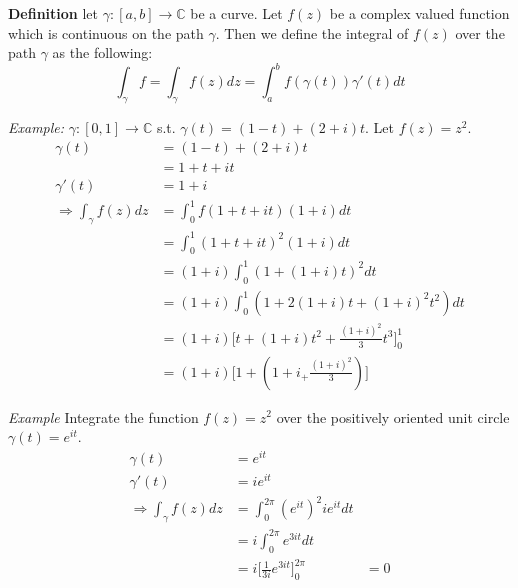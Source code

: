 \documentclass[a4paper, 11pt]{article}
\begin{document}
\noindent \textbf{Definition} let $\gamma:[a,b]\rightarrow\mathbb{C}$ be a curve. Let $f(z)$ be a complex valued function which is continuous on the path $\gamma$. Then we define the integral of $f(z)$ over the path $\gamma$ as the following: 
	\begin{equation*}
	\int_\gamma f = \int_\gamma f(z)dz = \int_a^b f(\gamma(t))\gamma'(t)dt
	\end{equation*}
		
\noindent\textit{Example:} $\gamma:[0,1]\rightarrow\mathbb{C}$ s.t. $\gamma(t) = (1-t)+(2+i)t$. Let $f(z)=z^2$. 
	\begin{align*}
		\gamma(t) &= (1-t) +(2+i)t \\ 	
			&= 1+ t + it \\ 
		\gamma'(t) &= 1+i \\ 
		\Rightarrow \int_\gamma f(z)dz &= \int_0^1 f(1+t+it)(1+i)dt \\ 
			&= \int_0^1 (1+t+it)^2(1+i)dt \\ 
			&= (1+i)\int_0^1 (1+(1+i)t)^2dt \\ 
			&= (1+i)\int_0^1 (1+2(1+i)t+(1+i)^2t^2)dt \\
			&= (1+i)\Big[t + (1+i)t^2+\frac{(1+i)^2}{3}t^3\Big]_0^1 \\ 
			&= (1+i)\Big[1 + (1+i_ + \frac{(1+i)^2}{3})\Big]  
	\end{align*}

\noindent \textit{Example} Integrate the function $f(z)=z^2$ over the positively oriented unit circle $\gamma(t) = e^{it}$. 
	\begin{align*}
		\gamma(t) &= e^{it} \\ 
		\gamma'(t) &= ie^{it} \\ 
		\Rightarrow \int_\gamma f(z)dz &= \int_0^{2\pi}(e^{it})^2ie^{it}dt \\ 
			&= i\int_0^{2\pi}e^{3it}dt  \\ 
			&= i\Big[\frac{1}{3i}e^{3it}\Big]_0^{2\pi}
			&= 0
	\end{align*}









	
\end{document}
